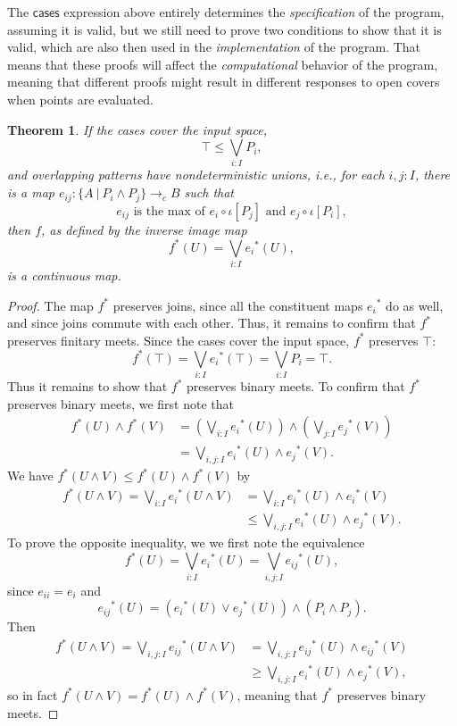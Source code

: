 \documentclass[conference]{IEEEtran}
\newtheorem{theorem}{Theorem}
\newcommand{\cto}{\to_c}
\newcommand{\suchthat}{\ |\ }
\newcommand{\oinclf}[1]{\iota[{#1}]}
\newcommand{\isthemaxof}[3]{{#1}\text{ is the max of }{#2}\text{ and }{#3}}
\newcommand{\iimg}[1]{{#1}^*}
\begin{document}
The $\mathsf{cases}$ expression above entirely determines the \emph{specification} of the program, assuming it is valid, but we still need to prove two conditions to show that it is valid, which are also then used in the \emph{implementation} of the program. That means that these proofs will affect the \emph{computational} behavior of the program, meaning that different proofs might result in different responses to open covers when points are evaluated. 
\begin{theorem}
\label{pattern}
If the cases cover the input space,
\[
\top \le \bigvee_{i : I} P_i \tag{covering},
\]
and overlapping patterns have nondeterministic unions, i.e., for each $i, j : I$, there is a map $e_{ij} : \{A \suchthat P_i \wedge P_j \} \cto B$ such that
\[
\isthemaxof{ e_{ij} }{ e_i \circ \oinclf{P_j} }{ e_j \circ \oinclf{P_i} }, \tag{gluing}
\]
then $f$, as defined by the inverse image map
\[
\iimg{f}(U) = \bigvee_{i : I} \iimg{e_i}(U),
\]
is a continuous map.
\end{theorem}
\begin{proof}
The map $\iimg{f}$ preserves joins, since all the constituent maps $\iimg{e_i}$ do as well, and since joins commute with each other. Thus, it remains to confirm that $\iimg{f}$ preserves finitary meets.
Since the cases cover the input space, $\iimg{f}$ preserves $\top$:
\[
\iimg{f}(\top) = \bigvee_{i : I} \iimg{e_i}(\top) = \bigvee_{i : I}P_i = \top.
\]
Thus it remains to show that $\iimg{f}$ preserves binary meets.
To confirm that $\iimg{f}$ preserves binary meets, we first note that
\begin{align*}
\iimg{f}(U) \wedge \iimg{f}(V) 
  &= \left(\bigvee_{i : I} \iimg{e_i}(U) \right) \wedge \left( \bigvee_{j: I} \iimg{e_j}(V) \right)
\\ &= \bigvee_{i, j : I} \iimg{e_i}(U) \wedge \iimg{e_j}(V).
\end{align*}
We have $\iimg{f}(U \wedge V) \le \iimg{f}(U) \wedge \iimg{f}(V)$ by
\begin{align*}
\iimg{f}(U \wedge V)
  = \bigvee_{i : I} \iimg{e_i}(U \wedge V)
  &= \bigvee_{i : I} \iimg{e_i}(U) \wedge \iimg{e_i}(V)
  \\ &\le \bigvee_{i, j : I} \iimg{e_i}(U) \wedge \iimg{e_j}(V).
\end{align*}
To prove the opposite inequality, we we first note the equivalence
\[
\iimg{f}(U) = \bigvee_{i : I} \iimg{e_i}(U) = \bigvee_{i, j : I} \iimg{e_{ij}}(U),
\]
since $e_{ii} = e_i$ and 
\[
\iimg{e_{ij}}(U) = \left( \iimg{e_i}(U) \vee \iimg{e_j}(U) \right) \wedge \left(P_i \wedge P_j \right).
\]
Then
\begin{align*}
\iimg{f}(U \wedge V)
  = \bigvee_{i, j : I} \iimg{e_{ij}}(U \wedge V)
  &= \bigvee_{i, j : I} \iimg{e_{ij}}(U) \wedge \iimg{e_{ij}}(V)
  \\ &\ge \bigvee_{i, j : I} \iimg{e_i}(U) \wedge \iimg{e_j}(V),
\end{align*}
so in fact $\iimg{f}(U \wedge V) = \iimg{f}(U) \wedge \iimg{f}(V)$, meaning that $\iimg{f}$ preserves binary meets.
\end{proof}
\end{document}
